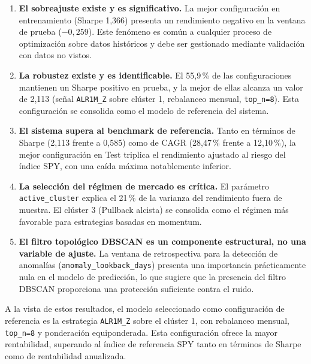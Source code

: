 \begin{enumerate}
    \item \textbf{El sobreajuste existe y es significativo.} La
    mejor configuración en entrenamiento (Sharpe 1,366) presenta
    un rendimiento negativo en la ventana de prueba (\(-0,259\)).
    Este fenómeno es común a cualquier proceso de optimización
    sobre datos históricos y debe ser gestionado mediante
    validación con datos no vistos.

    \item \textbf{La robustez existe y es identificable.} El
    55,9\,\% de las configuraciones mantienen un Sharpe positivo
    en prueba, y la mejor de ellas alcanza un valor de 2,113
    (señal \texttt{ALR1M\_Z} sobre clúster 1, rebalanceo mensual,
    \texttt{top\_n=8}). Esta configuración se consolida como el
    modelo de referencia del sistema.

    \item \textbf{El sistema supera al benchmark de referencia.}
    Tanto en términos de Sharpe (2,113 frente a 0,585) como de
    CAGR (28,47\,\% frente a 12,10\,\%), la mejor configuración
    en Test triplica el rendimiento ajustado al riesgo del
    índice SPY, con una caída máxima notablemente inferior.

    \item \textbf{La selección del régimen de mercado es
    crítica.} El parámetro \texttt{active\_cluster} explica el
    21\,\% de la varianza del rendimiento fuera de muestra. El
    clúster 3 (Pullback alcista) se consolida como el régimen
    más favorable para estrategias basadas en momentum.

    \item \textbf{El filtro topológico DBSCAN es un componente
    estructural, no una variable de ajuste.} La ventana de
    retrospectiva para la detección de anomalías (\texttt{anomaly\_lookback\_days})
    presenta una importancia prácticamente nula en el modelo de
    predicción, lo que sugiere que la presencia del filtro DBSCAN proporciona una protección
    suficiente contra el ruido.
\end{enumerate}

A la vista de estos resultados, el modelo seleccionado como
configuración de referencia es la estrategia
\texttt{ALR1M\_Z} sobre el clúster 1, con rebalanceo
mensual, \texttt{top\_n=8} y ponderación equiponderada.
Esta configuración ofrece la mayor rentabilidad, superando
al índice de referencia SPY tanto en términos
de Sharpe como de rentabilidad anualizada.


\endinput
